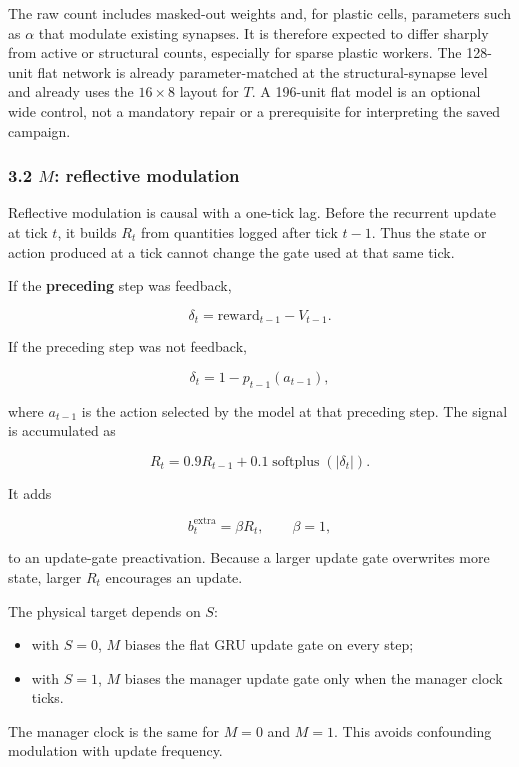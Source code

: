 \documentclass[
  10pt,
]{article}
\providecommand{\tightlist}{%
  \setlength{\itemsep}{0pt}\setlength{\parskip}{0pt}}
\begin{document}
The raw count includes masked-out weights and, for plastic cells,
parameters such as \(\alpha\) that modulate existing synapses. It is
therefore expected to differ sharply from active or structural counts,
especially for sparse plastic workers. The 128-unit flat network is
already parameter-matched at the structural-synapse level and already
uses the \(16\times8\) layout for \(T\). A 196-unit flat model is an
optional wide control, not a mandatory repair or a prerequisite for
interpreting the saved campaign.

\hypertarget{m-reflective-modulation}{%
\subsubsection{\texorpdfstring{3.2 \(M\): reflective
modulation}{3.2 M: reflective modulation}}\label{m-reflective-modulation}}

Reflective modulation is causal with a one-tick lag. Before the
recurrent update at tick \(t\), it builds \(R_t\) from quantities logged
after tick \(t-1\). Thus the state or action produced at a tick cannot
change the gate used at that same tick.

If the \textbf{preceding} step was feedback,

\[
\delta_t=\text{reward}_{t-1}-V_{t-1}.
\]

If the preceding step was not feedback,

\[
\delta_t=1-p_{t-1}(a_{t-1}),
\]

where \(a_{t-1}\) is the action selected by the model at that preceding
step. The signal is accumulated as

\[
R_t=0.9R_{t-1}+0.1\operatorname{softplus}(|\delta_t|).
\]

It adds

\[
b_t^{\mathrm{extra}}=\beta R_t,\qquad \beta=1,
\]

to an update-gate preactivation. Because a larger update gate overwrites
more state, larger \(R_t\) encourages an update.

The physical target depends on \(S\):

\begin{itemize}
\tightlist
\item
  with \(S=0\), \(M\) biases the flat GRU update gate on every step;
\item
  with \(S=1\), \(M\) biases the manager update gate only when the
  manager clock ticks.
\end{itemize}

The manager clock is the same for \(M=0\) and \(M=1\). This avoids
confounding modulation with update frequency.
\end{document}
